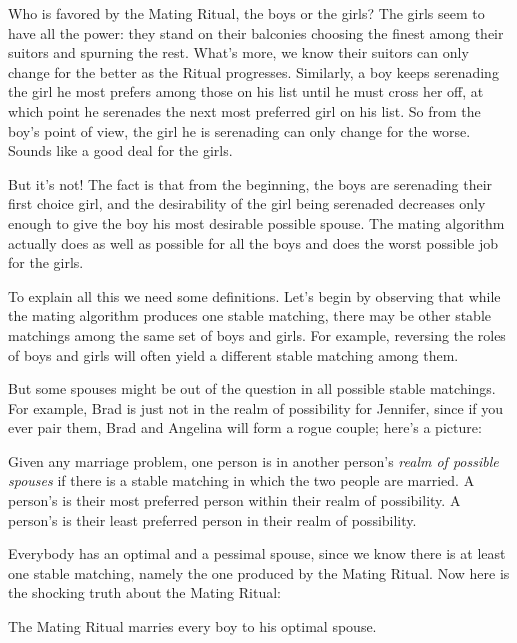Who is favored by the Mating Ritual, the boys or the girls?  The girls
seem to have all the power: they stand on their balconies choosing the
finest among their suitors and spurning the rest.  What's more, we know
their suitors can only change for the better as the Ritual progresses.
Similarly, a boy keeps serenading the girl he most prefers among those on
his list until he must cross her off, at which point he serenades the next
most preferred girl on his list.  So from the boy's point of view, the
girl he is serenading can only change for the worse.  Sounds like a good
deal for the girls.

But it's not!  The fact is that from the beginning, the boys are
serenading their first choice girl, and the desirability of the girl being
serenaded decreases only enough to give the boy his most desirable
possible spouse.  The mating algorithm actually does as well as possible
for all the boys and does the worst possible job for the girls.

To explain all this we need some definitions.  Let's begin by observing
that while the mating algorithm produces one stable matching, there may be
other stable matchings among the same set of boys and girls.  For example,
reversing the roles of boys and girls will often yield a different stable
matching among them.

But some spouses might be out of the question in all possible stable
matchings.  For example, Brad is just not in the realm of possibility for
Jennifer, since if you ever pair them, Brad and Angelina will form a rogue
couple; here's a picture:


\begin{definition}
Given any marriage problem, one person is in another person's \emph{realm
of possible spouses} if there is a stable matching in which the two people
are married.  A person's  is their most preferred
person within their realm of possibility.  A person's  is their least preferred person in their realm of possibility.
\end{definition}

Everybody has an optimal and a pessimal spouse, since we know there is at
least one stable matching, namely the one produced by the Mating Ritual.
Now here is the shocking truth about the Mating Ritual:

\begin{theorem}\label{boyopt}
The Mating Ritual marries every boy to his optimal spouse.
\end{theorem}

